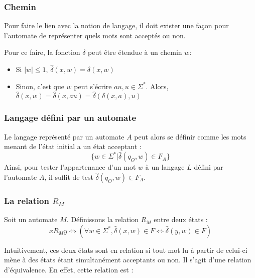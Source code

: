 	 \subsubsection{Chemin}
	 
	 Pour faire le lien avec la notion de langage, il doit exister une façon pour l'automate de représenter quels mots sont acceptés ou non.
	 
	 Pour ce faire, la fonction $\delta$ peut être étendue à un chemin $w$:
	 
	 \begin{itemize}
	 	\item Si $|w| \leq 1$, $\hat{\delta}(x, w) = \delta(x, w)$
	 	\item Sinon, c'est que $w$ peut s'écrire $au, u \in \Sigma^*$. Alors, $\hat{\delta}(x,w) = \hat{\delta}(x,au) = \hat{\delta}(\delta(x,a),u)$
	 \end{itemize}
	 
	 \subsubsection{Langage défini par un automate}
	 
	 Le langage représenté par un automate $A$ peut alors se définir comme les mots menant de l'état initial a un état acceptant :
	 $$
	 \{w \in \Sigma^* | \hat{\delta}(q_O,w) \in F_A\}
	 $$
	 Ainsi, pour tester l'appartenance d'un mot $w$ à un langage $L$ défini par l'automate $A$, il suffit de test $\hat{\delta}(q_O,w) \in F_A$.
	 
	 \subsubsection{La relation $R_M$}\label{ss:rm}
	 
	 Soit un automate $M$. Définissons la relation $R_M$ entre deux états : $$xR_My \iff (\forall w \in \Sigma^*, \hat{\delta}(x,w) \in F \iff \hat{\delta}(y,w) \in F)$$
	 
	 Intuitivement, ces deux états sont en relation si tout mot lu à partir de celui-ci mène à des états étant simultanément acceptants ou non. Il s'agit d'une relation d'équivalence. En effet, cette relation est :
	 
